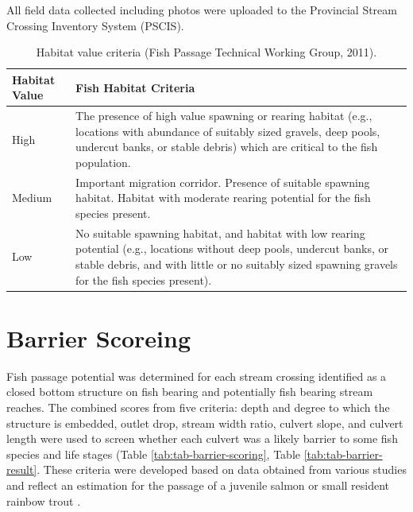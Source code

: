 \documentclass[
]{book}
\begin{document}
All field data collected including photos were uploaded to the Provincial Stream Crossing Inventory System (PSCIS).

\begin{table}

\caption{\label{tab:tab-hab-value}Habitat value criteria (Fish Passage Technical Working Group, 2011).}
\centering
\begin{tabu} to 
\hline
Habitat Value & Fish Habitat Criteria\\
\hline
High & The presence of high value spawning or rearing habitat (e.g., locations with abundance of suitably sized gravels, deep pools, undercut banks, or stable debris) which are critical to the fish population.\\
\hline
Medium & Important migration corridor. Presence of suitable spawning habitat. Habitat with moderate rearing potential for the fish species present.\\
\hline
Low & No suitable spawning habitat, and habitat with low rearing potential (e.g., locations without deep pools, undercut banks, or stable debris, and with little or no suitably sized spawning gravels for the fish species present).\\
\hline
\end{tabu}
\end{table}

\hypertarget{barrier-scoreing}{%
\section{Barrier Scoreing}\label{barrier-scoreing}}

Fish passage potential was determined for each stream crossing identified as a closed bottom structure on fish bearing and potentially fish bearing stream reaches. The combined scores from five criteria: depth and degree to which the structure is embedded, outlet drop, stream width ratio, culvert slope, and culvert length were used to screen whether each culvert was a likely barrier to some fish species and life stages (Table \ref{tab:tab-barrier-scoring}, Table \ref{tab:tab-barrier-result}. These criteria were developed based on data obtained from various studies and reflect an estimation for the passage of a juvenile salmon or small resident rainbow trout \citetext{\citealp[ ]{clarkinNationalInventoryAssessment2005}; \citealp{bellFisheriesHandbookEngineering1991}; \citealp{thompsonAssessingFishPassage2013}}.
\end{document}
